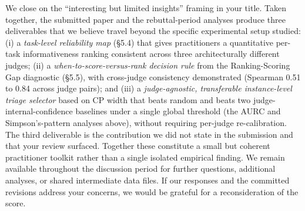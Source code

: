 \documentclass[11pt]{article}
\begin{document}
We close on the ``interesting but limited insights'' framing in your title. Taken together, the submitted paper and the rebuttal-period analyses produce three deliverables that we believe travel beyond the specific experimental setup studied: (i) a \emph{task-level reliability map} (\S 5.4) that gives practitioners a quantitative per-task informativeness ranking consistent across three architecturally different judges; (ii) a \emph{when-to-score-versus-rank decision rule} from the Ranking-Scoring Gap diagnostic (\S 5.5), with cross-judge consistency demonstrated (Spearman 0.51 to 0.84 across judge pairs); and (iii) a \emph{judge-agnostic, transferable instance-level triage selector} based on CP width that beats random and beats two judge-internal-confidence baselines under a single global threshold (the AURC and Simpson's-pattern analyses above), without requiring per-judge re-calibration. The third deliverable is the contribution we did not state in the submission and that your review surfaced. Together these constitute a small but coherent practitioner toolkit rather than a single isolated empirical finding. We remain available throughout the discussion period for further questions, additional analyses, or shared intermediate data files. If our responses and the committed revisions address your concerns, we would be grateful for a reconsideration of the score.
\end{document}
